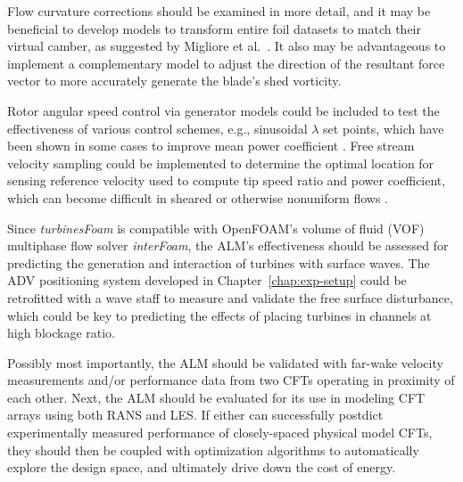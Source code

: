 Flow curvature corrections should be examined in more detail, and it may be
beneficial to develop models to transform entire foil datasets to match their
virtual camber, as suggested by Migliore et al.~\cite{Migliore1980}. It
also may be advantageous to implement a complementary model to adjust the
direction of the resultant force vector to more accurately generate the blade's
shed vorticity.

Rotor angular speed control via generator models could be included to test the
effectiveness of various control schemes, e.g., sinusoidal $\lambda$ set points,
which have been shown in some cases to improve mean power coefficient
\cite{Strom2015}. Free stream velocity sampling could be implemented to
determine the optimal location for sensing reference velocity used to compute
tip speed ratio and power coefficient, which can become difficult in sheared or
otherwise nonuniform flows \cite{Forbush2015}.

Since \textit{turbinesFoam} is compatible with OpenFOAM's volume of fluid (VOF)
multiphase flow solver \textit{interFoam}, the ALM's effectiveness should be
assessed for predicting the generation and interaction of turbines with surface
waves. The ADV positioning system developed in Chapter~\ref{chap:exp-setup}
could be retrofitted with a wave staff to measure and validate the free surface
disturbance, which could be key to predicting the effects of placing turbines in
channels at high blockage ratio.

Possibly most importantly, the ALM should be validated with far-wake velocity
measurements and/or performance data from two CFTs operating in proximity of
each other. Next, the ALM should be evaluated for its use in modeling CFT arrays
using both RANS and LES. If either can successfully postdict experimentally
measured performance of closely-spaced physical model CFTs, they should then be
coupled with optimization algorithms to automatically explore the design space,
and ultimately drive down the cost of energy.
